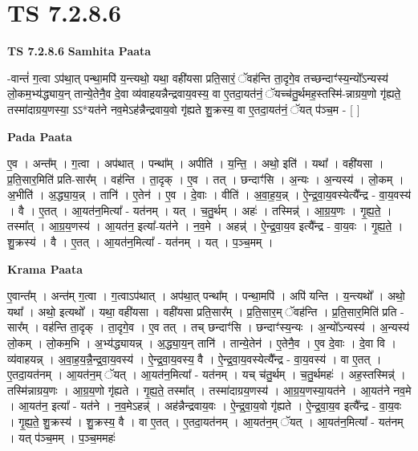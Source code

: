 \documentclass[17pt]{extarticle}
\begin{document}
\section{ TS 7.2.8.6 }

\textbf{TS 7.2.8.6 } \newline
\textbf{Samhita Paata} \newline

-वान्तं॑ ग॒त्वा ऽप॑था॒त् पन्था॒मपि॑ य॒न्त्यथो॒ यथा॒ वही॑यसा प्रति॒सारं॒ ॅवह॑न्ति ता॒दृगे॒व तच्छन्दाꣳ॑स्य॒न्यो᳚ऽन्यस्य॑ लो॒कम॒भ्य॑द्ध्याय॒न् तान्ये॒तेनै॒व दे॒वा व्य॑वाहयन्नैन्द्रवाय॒वस्य॒ वा ए॒तदा॒यत॑नं॒ ॅयच्च॑तु॒र्थमह॒स्तस्मि॑-न्नाग्रय॒णो गृ॑ह्यते॒ तस्मा॑दाग्रय॒णस्या॒ ऽऽ*यत॑ने नव॒मेऽह॑न्नैन्द्रवाय॒वो गृ॑ह्यते शु॒क्रस्य॒ वा ए॒तदा॒यत॑नं॒ ॅयत् प॑ञ्च॒म - [  ] \newline

\textbf{Pada Paata} \newline

ए॒व । अन्त᳚म् । ग॒त्वा । अप॑थात् । पन्था᳚म् । अपीति॑ । य॒न्ति॒ । अथो॒ इति॑ । यथा᳚ । वही॑यसा । प्र॒ति॒सार॒मिति॑ प्रति-सार᳚म् । वह॑न्ति । ता॒दृक् । ए॒व । तत् । छन्दाꣳ॑सि । अ॒न्यः । अ॒न्यस्य॑ । लो॒कम् । अ॒भीति॑ । अ॒द्ध्या॒य॒न्न् । तानि॑ । ए॒तेन॑ । ए॒व । दे॒वाः । वीति॑ । अ॒वा॒ह॒य॒न्न् । ऐ॒न्द्र॒वा॒य॒वस्येत्यै᳚न्द्र - वा॒य॒वस्य॑ । वै । ए॒तत् । आ॒यत॑न॒मित्या᳚ - यत॑नम् । यत् । च॒तु॒र्थम् । अहः॑ । तस्मिन्न्॑ । आ॒ग्र॒य॒णः । गृ॒ह्य॒ते॒ । तस्मा᳚त् । आ॒ग्र॒य॒णस्य॑ । आ॒यत॑न॒ इत्या᳚-यत॑ने । न॒व॒मे । अहन्न्॑ । ऐ॒न्द्र॒वा॒य॒व इत्यै᳚न्द्र - वा॒य॒वः । गृ॒ह्य॒ते॒ । शु॒क्रस्य॑ । वै । ए॒तत् । आ॒यत॑न॒मित्या᳚ - यत॑नम् । यत् । प॒ञ्च॒मम् ।  \newline


\textbf{Krama Paata} \newline

ए॒वान्त᳚म् । अन्त॑म् ग॒त्वा । ग॒त्वाऽप॑थात् । अप॑था॒त् पन्था᳚म् । पन्था॒मपि॑ । अपि॑ यन्ति । य॒न्त्यथो᳚ । अथो॒ यथा᳚ । अथो॒ इत्यथो᳚ । यथा॒ वही॑यसा । वही॑यसा प्रति॒सार᳚म् । प्र॒ति॒सार॒म् ॅवह॑न्ति । प्र॒ति॒सार॒मिति॑ प्रति - सार᳚म् । वह॑न्ति ता॒दृक् । ता॒दृगे॒व । ए॒व तत् । तच् छन्दाꣳ॑सि । छन्दाꣳ॑स्य॒न्यः । अ॒न्यो᳚ऽन्यस्य॑ । अ॒न्यस्य॑ लो॒कम् । लो॒कम॒भि । अ॒भ्य॑द्ध्यायन्न् । अ॒द्ध्या॒य॒न् तानि॑ । तान्ये॒तेन॑ । ए॒तेनै॒व । ए॒व दे॒वाः । दे॒वा वि । व्य॑वाहयन्न् । अ॒वा॒ह॒य॒न्नै॒न्द्र॒वा॒य॒वस्य॑ । ऐ॒न्द्र॒वा॒य॒वस्य॒ वै । ऐ॒न्द्र॒वा॒य॒वस्येत्यै᳚न्द्र - वा॒य॒वस्य॑ । वा ए॒तत् । ए॒तदा॒यत॑नम् । आ॒यत॑न॒म् ॅयत् । आ॒यत॑न॒मित्या᳚ - यत॑नम् । यच् च॑तु॒र्थम् । च॒तु॒र्थमहः॑ । अह॒स्तस्मिन्न्॑ । तस्मि॑न्नाग्रय॒णः । आ॒ग्र॒य॒णो गृ॑ह्यते । गृ॒ह्य॒ते॒ तस्मा᳚त् । तस्मा॑दाग्रय॒णस्य॑ । आ॒ग्र॒य॒णस्या॒यत॑ने । आ॒यत॑ने नव॒मे । आ॒यत॑न॒ इत्या᳚ - यत॑ने । न॒व॒मेऽहन्न्॑ । अह॑न्नैन्द्रवाय॒वः । ऐ॒न्द्र॒वा॒य॒वो गृ॑ह्यते । ऐ॒न्द्र॒वा॒य॒व इत्यै᳚न्द्र - वा॒य॒वः । गृ॒ह्य॒ते॒ शु॒क्रस्य॑ । शु॒क्रस्य॒ वै । वा ए॒तत् । ए॒तदा॒यत॑नम् । आ॒यत॑न॒म् ॅयत् । आ॒यत॑न॒मित्या᳚ - यत॑नम् । यत् प॑ञ्च॒मम् । प॒ञ्च॒ममहः॑ \newline
\end{document}
